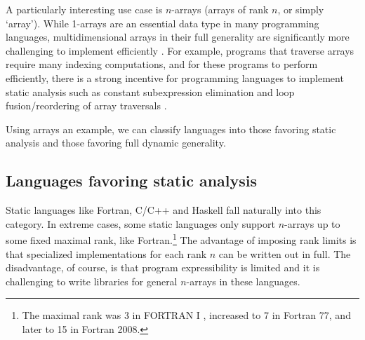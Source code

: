 \documentclass[preprint]{sigplanconf}
\begin{document}




A particularly interesting use case is $n$-arrays (arrays of rank $n$, or
simply `array'). While 1-arrays are an essential data type in many programming
languages, multidimensional arrays in their full generality are significantly
more challenging to implement efficiently \cite{Sattley:1960as,
Sattley:1961as, Randell:1964a6}. For example, programs that traverse arrays
require many indexing computations, and for these programs to perform
efficiently, there is a strong incentive for programming languages to
implement static analysis such as constant subexpression elimination and loop
fusion/reordering of array traversals \cite{Busam:1969oe}.

Using arrays an example, we can classify languages into those favoring
static analysis and those favoring full dynamic generality.

%

\subsection{Languages favoring static analysis}

Static languages like Fortran, C/C++ and Haskell fall naturally into this
category. In extreme cases, some static languages only support $n$-arrays up
to some fixed maximal rank, like Fortran.\footnote{The maximal rank was 3 in
FORTRAN I \cite{Backus:1957fa}, increased to 7 in Fortran 77, and later to 15
in Fortran 2008.} The advantage of imposing rank limits is that specialized
implementations for each rank $n$ can be written out in full. The
disadvantage, of course, is that program expressibility is limited and it is
challenging to write libraries for general $n$-arrays in these languages.
\end{document}
